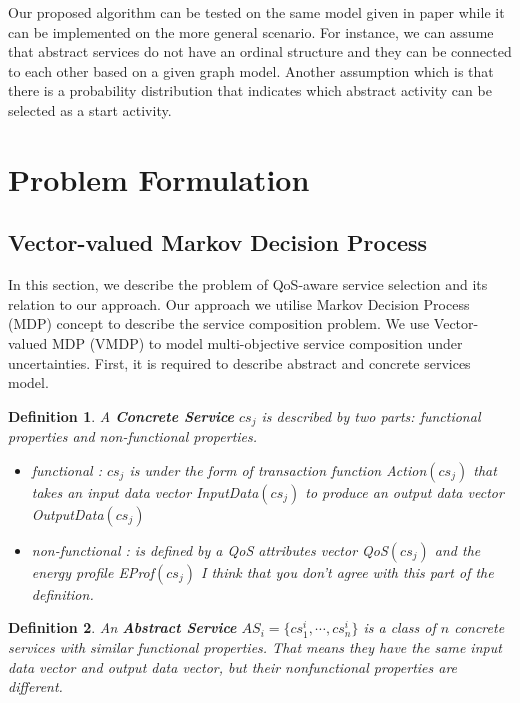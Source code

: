 \documentclass{sigchi}
\newtheorem{definition}{Definition}
\begin{document}
Our proposed algorithm can be tested on the same model given in paper \cite{DBLP:journals/tase/KhanoucheACKY16} while it can be implemented on the more general scenario. For instance, we can assume that abstract services do not have an ordinal structure and they can be connected to each other based on a given graph model. Another assumption which is that there is a probability distribution that indicates which abstract activity can be selected as a start activity. 

\section{Problem Formulation}

\subsection{Vector-valued Markov Decision Process}
In this section, we describe the problem of QoS-aware service selection and its relation to our approach. Our approach we utilise Markov Decision Process (MDP) concept to describe the service composition problem. We use Vector-valued MDP (VMDP) to model multi-objective service composition under uncertainties. First, it is required to describe abstract and concrete services model. 

\begin{definition}
A \textbf{Concrete Service} $cs_j$ is described by two parts: functional properties and non-functional properties.
\begin{itemize}
\item functional : $cs_j$ is under the form of transaction function Action$(cs_j)$ that takes an input data vector InputData$(cs_j)$ to produce an output data vector OutputData$(cs_j)$ 
\item non-functional : is defined by a QoS attributes vector QoS$(cs_j)$ and the energy profile EProf$(cs_j)$ {\color{red} I think that you don't agree with this part of the definition}.  
\end{itemize}
\end{definition}

\begin{definition}
An \textbf{Abstract Service} $AS_i = \{ cs_1^i, \cdots, cs_n^i \}$ is a class of $n$ concrete services with similar functional properties. That means they have the same input data vector and output data vector, but their nonfunctional properties are different. 
\end{definition}
\end{document}

